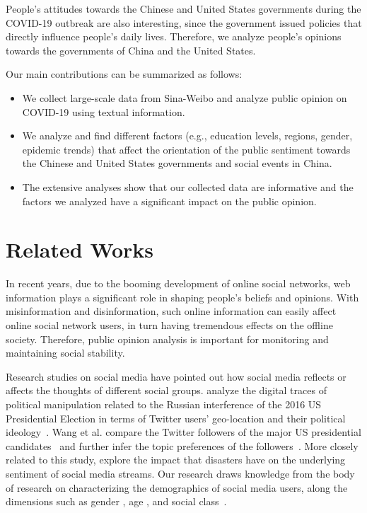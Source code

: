 \documentclass[sigconf, nonacm=true]{acmart}
\begin{document}
People's attitudes towards the Chinese and United States governments during the COVID-19 outbreak are also interesting, since the government issued policies that directly influence people's daily lives. Therefore, we analyze people's opinions towards the governments of China and the United States.

Our main contributions can be summarized as follows:
\begin{itemize}
        \item We collect large-scale data from Sina-Weibo and analyze public opinion on COVID-19 using textual information.

        \item We analyze and find different factors (e.g., education levels, regions, gender, epidemic trends) that affect the orientation of the public sentiment towards the Chinese and United States governments and social events in China.
        
        \item The extensive analyses show that our collected data are informative and the factors we analyzed have a significant impact on the public opinion.
\end{itemize}


\section{Related Works}
In recent years, due to the booming development
of online social networks, web information plays a significant role in shaping people's beliefs and opinions. With misinformation and disinformation,
such online
information can easily affect online social network users, in turn having tremendous effects
on the offline society. Therefore, public opinion analysis is important for monitoring and maintaining social stability.



Research studies on social media have pointed out how social media reflects \cite{j2} or affects \cite{o2011impact} the thoughts of different social groups. \citet{Badawy2018AnalyzingTD} analyze the digital traces of political manipulation related to the Russian interference of the 2016 US Presidential Election in terms of Twitter users' geo-location and their political ideology~\cite{b15}. Wang et al. compare the Twitter followers of the major US presidential candidates~\cite{j3, j6} and further infer the topic preferences of the followers~\cite{j4}. More closely related to this study, \cite{hutto2014vader, Lu2015VisualizingSM} explore the impact that disasters have on the underlying sentiment of social media streams. Our research draws knowledge from the body of research on characterizing the demographics of social media users, along the dimensions such as gender \cite{j6, rao2010classifying, Bergsma2013UsingCC}, age \cite{Nguyen2013HowOD, sloan2015tweets}, and social class~\cite{sloan2015tweets, agichtein2008finding}.
\end{document}
